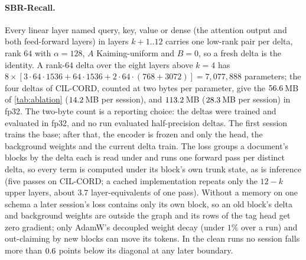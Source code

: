 \paragraph{SBR-Recall.} Every linear layer named query, key, value or dense (the attention output and both feed-forward layers) in layers $k{+}1..12$ carries one low-rank pair per delta, rank $64$ with $\alpha{=}128$, $A$ Kaiming-uniform and $B{=}0$, so a fresh delta is the identity. A rank-$64$ delta over the eight layers above $k{=}4$ has $8\times[3\cdot64\cdot1536+64\cdot1536+2\cdot64\cdot(768{+}3072)]=7{,}077{,}888$ parameters; the four deltas of CIL-CORD, counted at two bytes per parameter, give the $56.6$\,MB of \cref{tab:ablation} ($14.2$\,MB per session), and $113.2$\,MB ($28.3$\,MB per session) in fp32. The two-byte count is a reporting choice: the deltas were trained and evaluated in fp32, and no run evaluated half-precision deltas. The first session trains the base; after that, the encoder is frozen and only the head, the background weights and the current delta train. The loss groups a document's blocks by the delta each is read under and runs one forward pass per distinct delta, so every term is computed under its block's own trunk state, as is inference (five passes on CIL-CORD; a cached implementation repeats only the $12-k$ upper layers, about $3.7$ layer-equivalents of one pass). Without a memory on one schema a later session's loss contains only its own block, so an old block's delta and background weights are outside the graph and its rows of the tag head get zero gradient; only AdamW's decoupled weight decay (under $1\%$ over a run) and out-claiming by new blocks can move its tokens. In the clean runs no session falls more than $0.6$ points below its diagonal at any later boundary.

\begin{table}[t]
\centering\scriptsize
\setlength{\tabcolsep}{4pt}
\caption{\textbf{Memory accounting} (CIL-CORD: $250$ stored documents, or four deltas; $1$\,MB $=10^6$ bytes). Computed: the size of an encoding no run used, from the counts in the text. Full-label F1: clean runs, mean $\pm$ s.d. over three seeds. Trainable: parameters trained at once after session~1 (SBR-Recall: one delta at a time, four over the run); peak GPU memory and hours per run from the clean runs ($^{n=k}$: only $k$ uninterrupted runs timed). Generated.}
\label{tab:memory}

\end{table}

